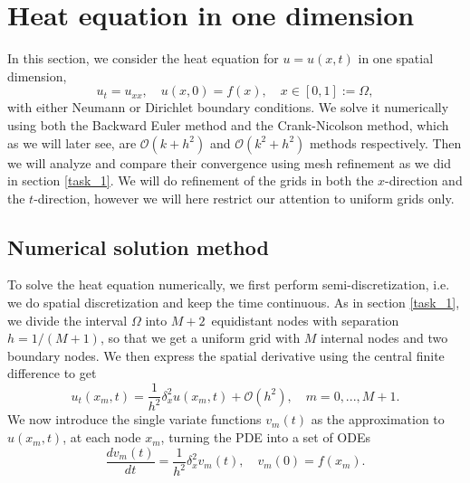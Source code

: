 \section{Heat equation in one dimension}
\label{heat-equation}
In this section, we consider the heat equation for $u = u(x, t)$ in one spatial dimension, 
\begin{equation*}
    u_t = u_{xx}, \quad u(x, 0) = f(x), \quad x \in [0,1] := \Omega, 
    \label{eq:heat-eq}
\end{equation*}
with either Neumann or Dirichlet boundary conditions. 
We solve it numerically using both the Backward Euler method and the Crank-Nicolson method, 
which as we will later see, 
are $\mathcal{O}(k+h^2)$ and $\mathcal{O}(k^2+h^2)$ methods respectively. 
Then we will analyze and compare their convergence using mesh refinement as we did in section \ref{task_1}. 
We will do refinement of the grids in both the $x$-direction and the $t$-direction, 
however we will here restrict our attention to uniform grids only. 

\subsection{Numerical solution method}
To solve the heat equation numerically, we first perform semi-discretization, 
i.e. we do spatial discretization and keep the time continuous. 
As in section \ref{task_1}, 
we divide the interval $\Omega$ into $M+2$ equidistant nodes with separation $h=1/(M+1)$, 
so that we get a uniform grid with $M$ internal nodes and two boundary nodes. 
We then express the spatial derivative using the central finite difference to get 
\begin{equation*}
    u_t(x_m, t) = \frac{1}{h^2} \delta_x^2 u(x_m, t) + \mathcal{O}(h^2), 
    \quad m = 0,...,M+1.
\end{equation*}
We now introduce the single variate functions $v_m(t)$ as the approximation to $u(x_m, t)$, 
at each node $x_m$, 
turning the PDE into a set of ODEs 
\begin{equation*}
    \frac{dv_m(t)}{dt} = \frac{1}{h^2} \delta_x^2 v_m(t), 
    \quad v_m(0) = f(x_m). 
\end{equation*}

